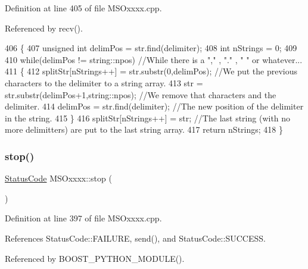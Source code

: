 Definition at line 405 of file M\+S\+Oxxxx.\+cpp.



Referenced by recv().


\begin{DoxyCode}
406 \{
407     \textcolor{keywordtype}{unsigned} \textcolor{keywordtype}{int} delimPos = str.find(delimiter);
408     \textcolor{keywordtype}{int} nStrings = 0;
409 
410     \textcolor{keywordflow}{while}(delimPos != string::npos)     \textcolor{comment}{//While there is a "," , "." , " " or whatever...}
411     \{
412         splitStr[nStrings++] = str.substr(0,delimPos);      \textcolor{comment}{//We put the previous characters to the
       delimiter to a string array.}
413         str = str.substr(delimPos+1,string::npos);              \textcolor{comment}{//We remove that characters and the
       delimiter.}
414         delimPos = str.find(delimiter);                                     \textcolor{comment}{//The new position of the
       delimiter in the string.}
415     \}
416     splitStr[nStrings++] = str;         \textcolor{comment}{//The last string (with no more delimitters) are put to the last
       string array.}
417     \textcolor{keywordflow}{return} nStrings;
418 \}
\end{DoxyCode}
\mbox{\label{classMSOxxxx_a4ec991c3850a652fbe9a1709cab7001b}} 
\subsubsection{\texorpdfstring{stop()}{stop()}}
{\footnotesize\ttfamily \hyperlink{classStatusCode}{Status\+Code} M\+S\+Oxxxx\+::stop (\begin{DoxyParamCaption}{ }\end{DoxyParamCaption})}



Definition at line 397 of file M\+S\+Oxxxx.\+cpp.



References Status\+Code\+::\+F\+A\+I\+L\+U\+RE, send(), and Status\+Code\+::\+S\+U\+C\+C\+E\+SS.



Referenced by B\+O\+O\+S\+T\+\_\+\+P\+Y\+T\+H\+O\+N\+\_\+\+M\+O\+D\+U\+L\+E().


